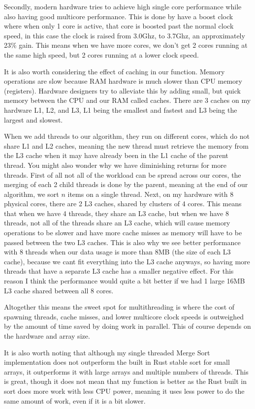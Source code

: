 \documentclass[12pt,letterpaper]{report}
\begin{document}
	Secondly, modern hardware tries to achieve high single core performance while also having good multicore performance. This is done by have a boost clock where when only 1 core is active, that core is boosted past the normal clock speed, in this case the clock is raised from 3.0Ghz, to 3.7Ghz, an approximately 23\% gain. This means when we have more cores, we don't get 2 cores running at the same high speed, but 2 cores running at a lower clock speed.
	
	It is also worth considering the effect of caching in our function. Memory operations are slow because RAM hardware is much slower than CPU memory (registers). Hardware designers try to alleviate this by adding small, but quick memory between the CPU and our RAM called caches. There are 3 caches on my hardware L1, L2, and L3, L1 being the smallest and fastest and L3 being the largest and slowest.
	
	When we add threads to our algorithm, they run on different cores, which do not share L1 and L2 caches, meaning the new thread must retrieve the memory from the L3 cache when it may have already been in the L1 cache of the parent thread. You might also wonder why we have diminishing returns for more threads. First of all not all of the workload can be spread across our cores, the merging of each 2 child threads is done by the parent, meaning at the end of our algorithm, we sort $n$ items on a single thread. Next, on my hardware with 8 physical cores, there are 2 L3 caches, shared by clusters of 4 cores. This means that when we have 4 threads, they share an L3 cache, but when we have 8 threads, not all of the threads share an L3 cache, which will cause memory operations to be slower and have more cache misses as memory will have to be passed between the two L3 caches. This is also why we see better performance with 8 threads when our data usage is more than 8MB (the size of each L3 cache), because we cant fit everything into the L3 cache anyways, so having more threads that have a separate L3 cache has a smaller negative effect. For this reason I think the performance would quite a bit better if we had 1 large 16MB L3 cache shared between all 8 cores.
	
	Altogether this means the sweet spot for multithreading is where the cost of spawning threads, cache misses, and lower multicore clock speeds is outweighed by the amount of time saved by doing work in parallel. This of course depends on the hardware and array size.
	
	It is also worth noting that although my single threaded Merge Sort implementation does not outperform the built in Rust stable sort for small arrays, it outperforms it with large arrays and multiple numbers of threads. This is great, though it does not mean that my function is better as the Rust built in sort does more work with less CPU power, meaning it uses less power to do the same amount of work, even if it is a bit slower.
	
\end{document}
